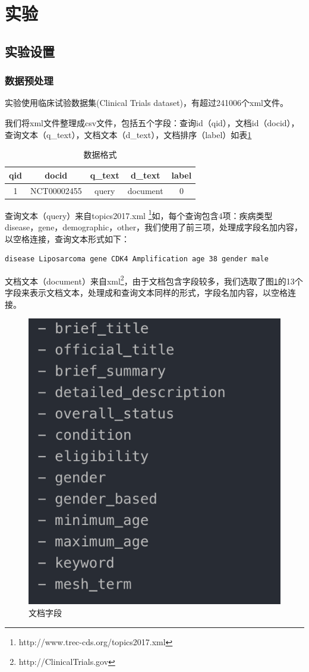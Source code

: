\documentclass[a4paper]{article}
\begin{document}
\pagebreak
\section{实验} 

\subsection{实验设置}

\subsubsection{数据预处理}

实验使用临床试验数据集(Clinical Trials dataset)，有超过241006个xml文件。

我们将xml文件整理成csv文件，包括五个字段：查询id（qid），文档id（docid），查询文本（q\_text），文档文本（d\_text），文档排序（label）如表\ref{tab:csv}
\begin{table}[htbp]
\caption{数据格式}\label{tab:csv}
\centering
\begin{tabular}{ccccc}
\hline
qid & docid  & q\_text & d\_text & label \\
\hline
1 &	NCT00002455 &  query  & document & 0 \\
\hline
\end{tabular}
\end{table}


查询文本（query）来自topics2017.xml \footnote{http://www.trec-cds.org/topics2017.xml}如，每个查询包含4项：疾病类型disease，gene，demographic，other，我们使用了前三项，处理成字段名加内容，以空格连接，查询文本形式如下：

\begin{lstlisting}
disease Liposarcoma gene CDK4 Amplification age 38 gender male	
\end{lstlisting}

文档文本（document）来自xml\footnote{http://ClinicalTrials.gov}，由于文档包含字段较多，我们选取了图\ref{fig:field}的13个字段来表示文档文本，处理成和查询文本同样的形式，字段名加内容，以空格连接。
\begin{figure}[!htbp]\centering
\vspace{1em}{}
  \includegraphics[width=0.4\linewidth]{选取字段.png}
  \caption{文档字段} 
  \label{fig:field}       %
  \vspace{1em}
\end{figure}
\end{document}
